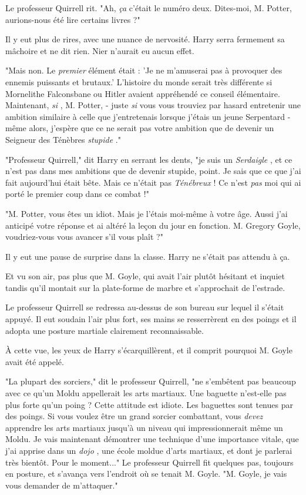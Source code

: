 Le professeur Quirrell rit. "Ah, \emph{ça}  c'était le numéro deux. Dites-moi, M. Potter, aurions-nous été lire certains livres ?"

Il y eut plus de rires, avec une nuance de nervosité. Harry serra fermement sa mâchoire et ne dit rien. Nier n'aurait eu aucun effet.

"Mais non. Le \emph{premier}  élément était : 'Je ne m'amuserai pas à provoquer des ennemis puissants et brutaux.' L'histoire du monde serait très différente si Mornelithe Falconsbane ou Hitler avaient appréhendé ce conseil élémentaire. Maintenant, \emph{si} , M. Potter, - juste \emph{si}  vous vous trouviez par hasard entretenir une ambition similaire à celle que j'entretenais lorsque j'étais un jeune Serpentard - même alors, j'espère que ce ne serait pas votre ambition que de devenir un Seigneur des Ténèbres \emph{stupide} ."

"Professeur Quirrell," dit Harry en serrant les dents, "je suis un \emph{Serdaigle} , et ce n'est pas dans mes ambitions que de devenir stupide, point. Je sais que ce que j'ai fait aujourd'hui était bête. Mais ce n'était pas \emph{Ténébreux}  ! Ce n'est \emph{pas}  moi qui ai porté le premier coup dans ce combat !"

"M. Potter, vous êtes un idiot. Mais je l'étais moi-même à votre âge. Aussi j'ai anticipé votre réponse et ai altéré la leçon du jour en fonction. M. Gregory Goyle, voudriez-vous vous avancer s'il vous plaît ?"

Il y eut une pause de surprise dans la classe. Harry ne s'était pas attendu à ça.

Et vu son air, pas plus que M. Goyle, qui avait l'air plutôt hésitant et inquiet tandis qu'il montait sur la plate-forme de marbre et s'approchait de l'estrade.

Le professeur Quirrell se redressa au-dessus de son bureau sur lequel il s'était appuyé. Il eut soudain l'air plus fort, ses mains se resserrèrent en des poings et il adopta une posture martiale clairement reconnaissable.

À cette vue, les yeux de Harry s'écarquillèrent, et il comprit pourquoi M. Goyle avait été appelé.

"La plupart des sorciers," dit le professeur Quirrell, "ne s'embêtent pas beaucoup avec ce qu'un Moldu appellerait les arts martiaux. Une baguette n'est-elle pas plus forte qu'un poing ? Cette attitude est idiote. Les baguettes sont tenues par des poings. Si vous voulez être un grand sorcier combattant, vous \emph{devez}  apprendre les arts martiaux jusqu'à un niveau qui impressionnerait même un Moldu. Je vais maintenant démontrer une technique d'une importance vitale, que j'ai apprise dans un \emph{dojo} , une école moldue d'arts martiaux, et dont je parlerai très bientôt. Pour le moment..." Le professeur Quirrell fit quelques pas, toujours en posture, et s'avança vers l'endroit où se tenait M. Goyle. "M. Goyle, je vais vous demander de m'attaquer."


